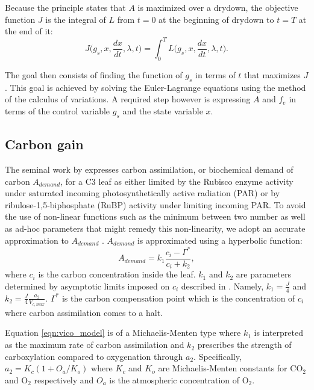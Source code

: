 \documentclass[utf8]{frontiersSCNS} %
\begin{document}
Because the principle states that $A$ is maximized over a drydown, the objective function $J$ is the integral of $L$ from $t=0$ at the beginning of drydown to $t=T$ at the end of it:
\begin{equation}
    \label{eqn:Objective}
    J\Big(g_s, x, \frac{dx}{dt}, \lambda, t\Big) = \int_0^T L\Big(g_s, x, \frac{dx}{dt}, \lambda, t\Big).
\end{equation}

The goal then consists of finding the function of $g_s$ in terms of $t$ that maximizes $J$. This goal is achieved by solving the Euler-Lagrange equations using the method of the calculus of variations. A required step however is expressing $A$ and $f_e$ in terms of the control variable $g_s$ and the state variable $x$.

\subsection{Carbon gain}

The seminal work by \citet{Farquhar1980} expresses carbon assimilation, or biochemical demand of carbon $A_{demand}$, for a C3 leaf as either limited by the Rubisco enzyme activity under saturated incoming photosynthetically active radiation (PAR) or by ribulose-1,5-biphosphate (RuBP) activity under limiting incoming PAR. 
To avoid the use of non-linear functions such as the minimum between two number as well as ad-hoc parameters that might remedy this non-linearity, we adopt an accurate approximation to $A_{demand}$ \citep{Vico2013}. $A_{demand}$ is approximated using a hyperbolic function:
\begin{equation}
    \label{eqn:vico_model}
    A_{demand} = k_1 \frac{c_i - \Gamma^*}{c_i + k_2},
\end{equation}
where $c_i$ is the carbon concentration inside the leaf. $k_1$ and $k_2$ are parameters determined by asymptotic limits imposed on $c_i$ described in \citet{Vico2013}. Namely, $k_1 = \frac{J}{4}$ and $k_2 = \frac{J}{4} \frac{a_2}{V_{c,max}}$. $\Gamma^*$ is the carbon compensation point which is the concentration of $c_i$ where carbon assimilation comes to a halt.

Equation \ref{eqn:vico_model} is of a Michaelis-Menten type where $k_1$ is interpreted as the maximum rate of carbon assimilation and $k_2$ prescribes the strength of carboxylation compared to oxygenation through $a_2$. Specifically, $a_2 = K_c (1+O_a/K_o)$ where $K_c$ and $K_o$ are Michaelis-Menten constants for CO$_2$ and O$_2$ respectively and $O_a$ is the atmospheric concentration of O$_2$.
\end{document}
